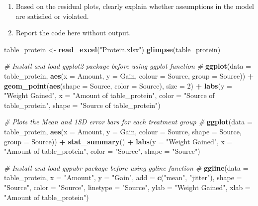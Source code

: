 \documentclass[]{article}
\newenvironment{Shaded}{\begin{snugshade}}{\end{snugshade}}
\newcommand{\CommentTok}[1]{\textcolor[rgb]{0.56,0.35,0.01}{\textit{#1}}}
\newcommand{\DataTypeTok}[1]{\textcolor[rgb]{0.13,0.29,0.53}{#1}}
\newcommand{\DecValTok}[1]{\textcolor[rgb]{0.00,0.00,0.81}{#1}}
\newcommand{\KeywordTok}[1]{\textcolor[rgb]{0.13,0.29,0.53}{\textbf{#1}}}
\newcommand{\NormalTok}[1]{#1}
\newcommand{\OperatorTok}[1]{\textcolor[rgb]{0.81,0.36,0.00}{\textbf{#1}}}
\newcommand{\StringTok}[1]{\textcolor[rgb]{0.31,0.60,0.02}{#1}}
\begin{document}
\begin{enumerate}
\def\labelenumi{(\alph{enumi})}
\setcounter{enumi}{5}
\item
  Based on the residual plots, clearly explain whether assumptions in
  the model are satisfied or violated.
\item
  Report the code here without output.
\end{enumerate}

\begin{Shaded}
\begin{Highlighting}[]
\NormalTok{table_protein <-}\StringTok{ }\KeywordTok{read_excel}\NormalTok{(}\StringTok{"Protein.xlsx"}\NormalTok{)}
\KeywordTok{glimpse}\NormalTok{(table_protein)}

\CommentTok{# Install and load ggplot2 package before using ggplot function #}
\KeywordTok{ggplot}\NormalTok{(}\DataTypeTok{data =}\NormalTok{ table_protein, }\KeywordTok{aes}\NormalTok{(}\DataTypeTok{x =}\NormalTok{ Amount, }\DataTypeTok{y =}\NormalTok{ Gain, }\DataTypeTok{colour =}\NormalTok{ Source, }\DataTypeTok{group =}\NormalTok{ Source)) }\OperatorTok{+}\StringTok{ }
\StringTok{    }\KeywordTok{geom_point}\NormalTok{(}\KeywordTok{aes}\NormalTok{(}\DataTypeTok{shape =}\NormalTok{ Source, }\DataTypeTok{color =}\NormalTok{ Source), }\DataTypeTok{size =} \DecValTok{2}\NormalTok{) }\OperatorTok{+}\StringTok{ }\KeywordTok{labs}\NormalTok{(}\DataTypeTok{y =} \StringTok{"Weight Gained"}\NormalTok{, }
    \DataTypeTok{x =} \StringTok{"Amount of table_protein"}\NormalTok{, }\DataTypeTok{color =} \StringTok{"Source of table_protein"}\NormalTok{, }\DataTypeTok{shape =} \StringTok{"Source of table_protein"}\NormalTok{)}

\CommentTok{# Plots the Mean and 1SD error bars for each treatment group #}
\KeywordTok{ggplot}\NormalTok{(}\DataTypeTok{data =}\NormalTok{ table_protein, }\KeywordTok{aes}\NormalTok{(}\DataTypeTok{x =}\NormalTok{ Amount, }\DataTypeTok{y =}\NormalTok{ Gain, }\DataTypeTok{colour =}\NormalTok{ Source, }\DataTypeTok{shape =}\NormalTok{ Source, }
    \DataTypeTok{group =}\NormalTok{ Source)) }\OperatorTok{+}\StringTok{ }\KeywordTok{stat_summary}\NormalTok{() }\OperatorTok{+}\StringTok{ }\KeywordTok{labs}\NormalTok{(}\DataTypeTok{y =} \StringTok{"Weight Gained"}\NormalTok{, }\DataTypeTok{x =} \StringTok{"Amount of table_protein"}\NormalTok{, }
    \DataTypeTok{color =} \StringTok{"Source"}\NormalTok{, }\DataTypeTok{shape =} \StringTok{"Source"}\NormalTok{)}

\CommentTok{# Install and load ggpubr package before using ggline function #}
\KeywordTok{ggline}\NormalTok{(}\DataTypeTok{data =}\NormalTok{ table_protein, }\DataTypeTok{x =} \StringTok{"Amount"}\NormalTok{, }\DataTypeTok{y =} \StringTok{"Gain"}\NormalTok{, }\DataTypeTok{add =} \KeywordTok{c}\NormalTok{(}\StringTok{"mean"}\NormalTok{, }\StringTok{"jitter"}\NormalTok{), }
    \DataTypeTok{shape =} \StringTok{"Source"}\NormalTok{, }\DataTypeTok{color =} \StringTok{"Source"}\NormalTok{, }\DataTypeTok{linetype =} \StringTok{"Source"}\NormalTok{, }\DataTypeTok{ylab =} \StringTok{"Weight Gained"}\NormalTok{, }
    \DataTypeTok{xlab =} \StringTok{"Amount of table_protein"}\NormalTok{)}


\end{Highlighting}
\end{Shaded}
\end{document}
